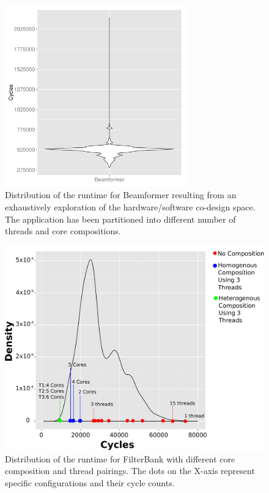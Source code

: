 \begin{figure}[h]
    \centering
    \includegraphics[width=0.7\textwidth]{streamit-paper/graphics/beamformer_motivation.pdf}
    \caption{Distribution of the runtime for Beamformer resulting from an exhaustively exploration of the hardware/software co-design space.
     The application has been partitioned into different number of threads and core compositions.}
     \label{fig:beamformermotiv}
\end{figure}

\begin{figure}[h]
    \centering
    \includegraphics[width=1\textwidth]{streamit-paper/graphics/temp_motivation_2.pdf}
    \caption{Distribution of the runtime for FilterBank with different core composition and thread pairings. The dots on the X-axis represent specific configurations and their cycle counts.}
     \label{fig:threadcoremotiv}
\end{figure}

